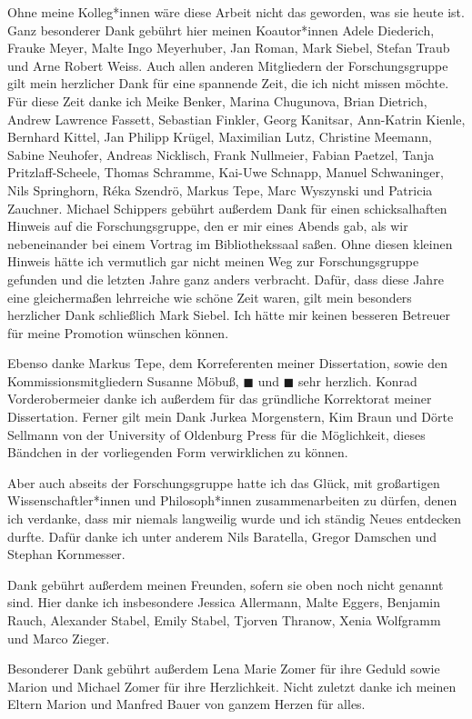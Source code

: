 \documentclass[justified,nobib,nohyper,symmetric,twoside]{tufte-book}
\begin{document}
Ohne meine Kolleg*innen wäre diese Arbeit nicht das geworden, was sie heute ist.
Ganz besonderer Dank gebührt hier meinen Koautor*innen Adele Diederich, Frauke Meyer, Malte Ingo Meyerhuber, Jan Roman, Mark Siebel, Stefan Traub und Arne Robert Weiss.
Auch allen anderen Mitgliedern der Forschungsgruppe gilt mein herzlicher Dank für eine spannende Zeit, die ich nicht missen möchte.
Für diese Zeit danke ich Meike Benker, Marina Chugunova, Brian Dietrich, Andrew Lawrence Fassett, Sebastian Finkler, Georg Kanitsar, Ann-Katrin Kienle, Bernhard Kittel, Jan Philipp Krügel, Maximilian Lutz, Christine Meemann, Sabine Neuhofer, Andreas Nicklisch, Frank Nullmeier, Fabian Paetzel, Tanja Pritzlaff-Scheele, Thomas Schramme, Kai-Uwe Schnapp, Manuel Schwaninger, Nils Springhorn, Réka Szendrö, Markus Tepe, Marc Wyszynski und Patricia Zauchner.
Michael Schippers gebührt außerdem Dank für einen schicksalhaften Hinweis auf die Forschungsgruppe, den er mir eines Abends gab, als wir nebeneinander bei einem Vortrag im Bibliothekssaal saßen.
Ohne diesen kleinen Hinweis hätte ich vermutlich gar nicht meinen Weg zur Forschungsgruppe gefunden und die letzten Jahre ganz anders verbracht.
Dafür, dass diese Jahre eine gleichermaßen lehrreiche wie schöne Zeit waren, gilt mein besonders herzlicher Dank schließlich Mark Siebel.
Ich hätte mir keinen besseren Betreuer für meine Promotion wünschen können.

Ebenso danke Markus Tepe, dem Korreferenten meiner Dissertation, sowie den Kommissionsmitgliedern Susanne Möbuß, $\blacksquare$ und $\blacksquare$ sehr herzlich.
Konrad Vorderobermeier danke ich außerdem für das gründliche Korrektorat meiner Dissertation.
Ferner gilt mein Dank Jurkea Morgenstern, Kim Braun und Dörte Sellmann von der University of Oldenburg Press für die Möglichkeit, dieses Bändchen in der vorliegenden Form verwirklichen zu können.

Aber auch abseits der Forschungsgruppe hatte ich das Glück, mit großartigen Wissenschaftler*innen und Philosoph*innen zusammenarbeiten zu dürfen, denen ich verdanke, dass mir niemals langweilig wurde und ich ständig Neues entdecken durfte.
Dafür danke ich unter anderem Nils Baratella, Gregor Damschen und Stephan Kornmesser.

Dank gebührt außerdem meinen Freunden, sofern sie oben noch nicht genannt sind.
Hier danke ich insbesondere Jessica Allermann, Malte Eggers, Benjamin Rauch, Alexander Stabel, Emily Stabel, Tjorven Thranow, Xenia Wolfgramm und Marco Zieger.

Besonderer Dank gebührt außerdem Lena Marie Zomer für ihre Geduld sowie Marion und Michael Zomer für ihre Herzlichkeit.
Nicht zuletzt danke ich meinen Eltern Marion und Manfred Bauer von ganzem Herzen für alles.
\end{document}
